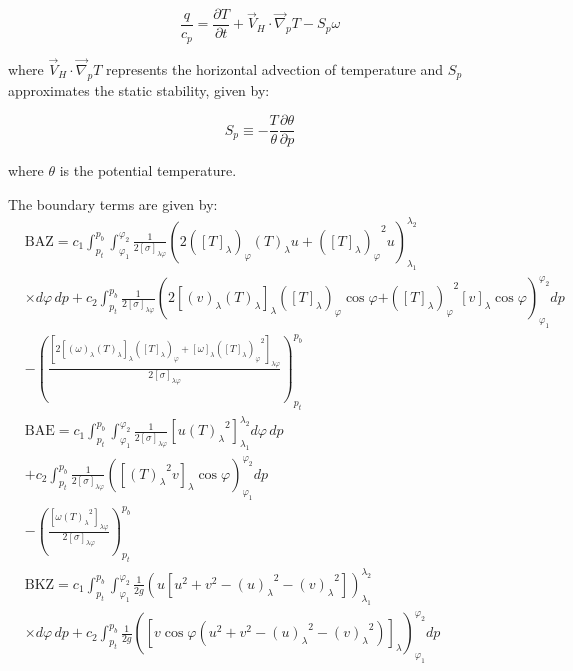 \documentclass[pdflatex,sn-chicago]{sn-jnl}%
\theoremstyle{plain}
\theoremstyle{definition}
\theoremstyle{remark}
\theoremstyle{definition}
\begin{document}
\begin{equation}
    \frac{q}{c_p} = \frac{\partial T}{\partial t} + \Vec{V}_H \cdot \Vec{\nabla}_p T - S_p\omega
\end{equation}

where $\Vec{V}_H \cdot \Vec{\nabla}_p T$ represents the horizontal advection of temperature and $S_p$ approximates the static stability, given by:

\begin{equation}
    S_p \equiv -\frac{T}{\theta}\frac{\partial \theta}{\partial p}
\end{equation}

where $\theta$ is the potential temperature. 


The boundary terms are given by:
\begin{align}
& \mathrm{BAZ}=c_1 \int_{p_t}^{p_b} \int_{\varphi_1}^{\varphi_2} \frac{1}{2[\sigma]_{\lambda\varphi}}\left(2\left([T]_\lambda\right)_{\varphi}(T)_\lambda u+{\left([T]_\lambda\right)_{\varphi}}^2 u\right)_{\lambda_1}^{\lambda_2} \nonumber \\
& \times d\varphi\,dp+c_2 \int_{p_t}^{p_b} \frac{1}{2[\sigma]_{\lambda\varphi}}\left(2\left[(v)_\lambda(T)_\lambda\right]_\lambda\left([T]_\lambda\right)_{\varphi}\cos\varphi \right. \left.+{\left([T]_\lambda\right)_{\varphi}}^2[v]_\lambda\cos\varphi\right)_{\varphi_1}^{\varphi_2} dp \nonumber \\
& -\left(\frac{\left[2\left[(\omega)_\lambda(T)_\lambda\right]_\lambda\left([T]_\lambda\right)_{\varphi}+[\omega]_\lambda{\left([T]_\lambda\right)_{\varphi}}^2\right]_{\lambda\varphi}}{2[\sigma]_{\lambda\varphi}}\right)_{p_t}^{p_b} \\
& \mathrm{BAE}=c_1 \int_{p_t}^{p_b} \int_{\varphi_1}^{\varphi_2} \frac{1}{2[\sigma]_{\lambda\varphi}}\left[u{(T)_\lambda}^2\right]_{\lambda_1}^{\lambda_2} d\varphi\,dp \nonumber \\
& +c_2 \int_{p_t}^{p_b} \frac{1}{2[\sigma]_{\lambda\varphi}}\left(\left[{(T)_\lambda}^2v\right]_\lambda\cos\varphi\right)_{\varphi_1}^{\varphi_2} dp \nonumber \\
& -\left(\frac{\left[\omega{(T)_\lambda}^2\right]_{\lambda\varphi}}{2[\sigma]_{\lambda\varphi}}\right)_{p_t}^{p_b} \\
& \mathrm{BKZ}=c_1 \int_{p_t}^{p_b} \int_{\varphi_1}^{\varphi_2} \frac{1}{2g}\left(u\left[u^2+v^2-{(u)_\lambda}^2-{(v)_\lambda}^2\right]\right)_{\lambda_1}^{\lambda_2} \nonumber \\
& \times d\varphi\,dp+c_2 \int_{p_t}^{p_b} \frac{1}{2g}\left(\left[v\cos\varphi\left(u^2+v^2-{(u)_\lambda}^2-{(v)_\lambda}^2\right)\right]_\lambda\right)_{\varphi_1}^{\varphi_2} dp \nonumber \\

\end{align}
\end{document}
